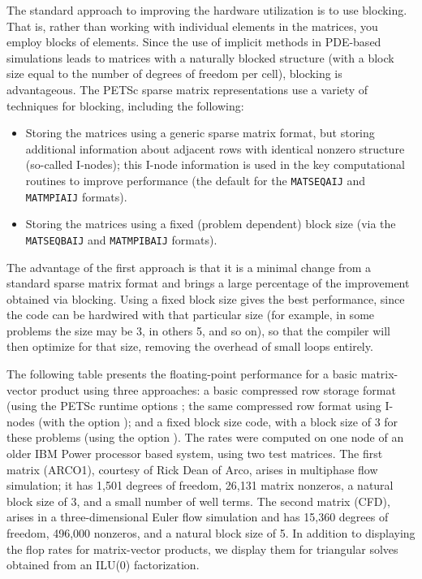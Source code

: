 The standard approach to improving the hardware utilization is to use
blocking. That is, rather than working with individual elements in
the matrices, you employ blocks of elements.  Since the use of
implicit methods in PDE-based simulations leads to matrices with a
naturally blocked structure (with a block size equal to the number of
degrees of freedom per cell), blocking is  advantageous.  The
PETSc sparse matrix representations use a variety
of techniques for blocking, including the following:

\begin{itemize}
\item Storing the matrices using a generic sparse matrix format, but
   storing additional information about adjacent rows with identical
   nonzero structure (so-called I-nodes); this I-node information is
   used in the key computational routines to improve performance
    (the default for the \lstinline{MATSEQAIJ} and \lstinline{MATMPIAIJ} formats).
\item Storing the matrices using a fixed (problem dependent) block size
  (via the \lstinline{MATSEQBAIJ} and \lstinline{MATMPIBAIJ} formats).
\end{itemize}

The advantage of the first approach is that it is a minimal change
from a standard sparse matrix format and brings a large percentage of the
improvement obtained via blocking.  Using a fixed block size gives
the best performance, since the code can be hardwired with that
particular size (for example, in some problems the size may be 3, in
others 5, and so on), so that the compiler will then optimize for that
size, removing the overhead of small loops entirely.

The following table presents the floating-point performance
for a basic matrix-vector product using  three approaches: a basic
compressed row storage format (using the PETSc runtime options
; the same compressed row format using
I-nodes (with the option ); and a fixed block size code,
with a block size of 3 for these problems (using the option
). The rates were computed on one
node of an older IBM Power processor based system, using two test matrices.  The first matrix
(ARCO1), courtesy of Rick Dean of Arco, arises in multiphase flow
simulation; it has 1,501 degrees of freedom, 26,131 matrix nonzeros,
 a natural block size of 3, and a small number of well terms. The
second matrix (CFD), arises in a three-dimensional Euler flow
simulation and has 15,360 degrees of freedom, 496,000 nonzeros, and a
natural block size of 5. In addition to displaying the flop rates for
matrix-vector products, we display them for triangular solves
obtained from an ILU(0) factorization.


